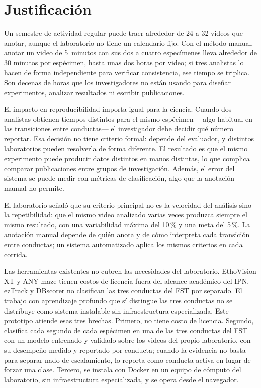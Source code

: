\section{Justificación}

Un semestre de actividad regular puede traer alrededor de 24 a 32 videos que anotar,
aunque el laboratorio no tiene un calendario fijo. Con el método manual, anotar un
video de 5~minutos con sus dos a cuatro especímenes lleva alrededor de 30 minutos por
espécimen, hasta unas dos horas por video; si tres analistas lo hacen de forma independiente para verificar consistencia,
ese tiempo se triplica. Son decenas de horas que los investigadores no están usando para
diseñar experimentos, analizar resultados ni escribir publicaciones.

El impacto en reproducibilidad importa igual para la ciencia. Cuando dos analistas
obtienen tiempos distintos para el mismo espécimen ---algo habitual en las transiciones entre
conductas--- el investigador debe decidir qué número reportar. Esa decisión no tiene
criterio formal: depende del evaluador, y distintos laboratorios pueden resolverla de
forma diferente. El resultado es que el mismo experimento puede producir datos distintos
en manos distintas, lo que complica comparar publicaciones entre grupos de investigación.
Además, el error del sistema se puede medir con métricas de clasificación, algo que la anotación manual no permite.

El laboratorio señaló que su criterio principal no es la velocidad del análisis sino la
repetibilidad: que el mismo video analizado varias veces produzca siempre el mismo
resultado, con una variabilidad máxima del 10\,\% y una meta del 5\,\%. La anotación manual depende
de quién anota y de cómo interpreta cada transición entre conductas; un sistema
automatizado aplica los mismos criterios en cada corrida.

Las herramientas existentes no cubren las necesidades del laboratorio. EthoVision XT \cite{noldus_ethovision} y
ANY-maze \cite{stoelting_anymaze} tienen costos de licencia fuera del alcance académico del IPN. ezTrack y
DBscorer no clasifican las tres conductas del FST por separado. El trabajo con
aprendizaje profundo que sí distingue las tres conductas
\cite{della_valle2025} no se distribuye como sistema instalable sin
infraestructura especializada. Este prototipo atiende esas tres brechas. Primero, no tiene costo de
licencia. Segundo, clasifica cada segundo de cada espécimen en una de las tres conductas
del FST con un modelo entrenado y validado sobre los videos del propio laboratorio, con
su desempeño medido y reportado por conducta; cuando la evidencia no basta para separar nado
de escalamiento, lo reporta como conducta activa en lugar de forzar una clase. Tercero,
se instala con Docker en un equipo de cómputo del laboratorio, sin infraestructura
especializada, y se opera desde el navegador.

